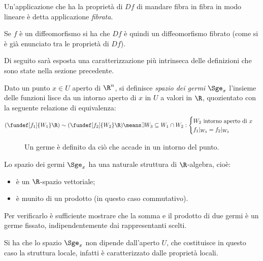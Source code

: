 \begin{defn}
	Un'applicazione che ha la proprietà di $Df$ di mandare fibra in fibra in modo lineare
	è detta applicazione \emph{fibrata}.
\end{defn}

Se $f$ è un diffeomorfismo si ha che $Df$ è quindi un diffeomorfismo fibrato
(come si è già enunciato tra le proprietà di $Df$).


Di seguito sarà esposta una caratterizzazione più intrinseca delle definizioni che sono state nella sezione precedente.

\begin{defn}
	Dato un punto $x\in U$ aperto di $\R ^n$,
	si definisce \emph{spazio dei germi} $\Sge_x$
	l'insieme delle funzioni lisce da un intorno aperto di $x$ in $U$ a valori in $\R$,
	quozientato con la seguente relazione di equivalenza:
	\begin{equation*}
		(\fundef[f_1]{W_1}\R) \sim (\fundef[f_2]{W_2}\R) \means
		\exists W_3 \subseteq W_1 \cap W_2:
		\begin{cases}
			\text{$W_3$ intorno aperto di $x$} \\
			f_1|_{W_3}=f_2|_{W_3}
		\end{cases}
	\end{equation*}
\end{defn}

\begin{figure}[h]
	\centering
	
	\caption{Un germe è definito da ciò che accade in un intorno del punto.}
\end{figure}

Lo spazio dei germi $\Sge_x$ ha una  naturale struttura di $\R$-algebra, cioè:
\begin{itemize}
	\item è un $\R$-spazio vettoriale;
	\item è munito di un prodotto (in questo caso commutativo).
\end{itemize}
Per verificarlo è sufficiente mostrare che
la somma e il prodotto di due germi è un germe fissato,
indipendentemente dai rappresentanti scelti.

\begin{oss}
	Si ha che lo spazio $\Sge_x$ non dipende dall'aperto $U$,
	che costituisce in questo caso la struttura locale,
	infatti è caratterizzato dalle proprietà locali.
\end{oss}

